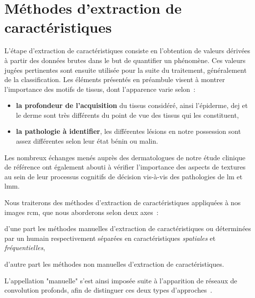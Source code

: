 \newpage

\section{Méthodes d'extraction de caractéristiques}
\label{chap:feature_extraction}
L'étape d'extraction de caractéristiques consiste en l'obtention de valeurs dérivées à partir des données brutes dans le but de quantifier un phénomène. Ces valeurs jugées pertinentes sont ensuite utilisée pour la suite du traitement, généralement de la classification. Les éléments présentés en préambule visent à montrer l'importance des motifs de tissus, dont l'apparence varie selon~:
\begin{itemize}
    \item \textbf{la profondeur de l'acquisition} du tissus considéré, ainsi l'épiderme, \gls{dej} et le derme sont très différents du point de vue des tissus qui les constituent,
    \item \textbf{la pathologie à identifier}, les différentes lésions en notre possession sont assez différentes selon leur état bénin ou malin.
\end{itemize}
Les nombreux échanges menés auprès des dermatologues de notre étude clinique de référence ont également abouti à vérifier l'importance des aspects de textures au sein de leur processus cognitifs de décision vis-à-vis des pathologies de \gls{lm} et \gls{lmm}.\par

Nous traiterons des méthodes d'extraction de caractéristiques appliquées à nos images \gls{rcm}, que nous aborderons selon deux axes~:
\begin{inlinerate}
    \item d'une part les méthodes manuelles d'extraction de caractéristiques ou déterminées par un humain respectivement séparées en caractéristiques \textit{spatiales} et \textit{fréquentielles},
    \item d'autre part les méthodes non manuelles d'extraction de caractéristiques.
\end{inlinerate} 
L'appellation "manuelle" s'est ainsi imposée suite à l'apparition de réseaux de convolution profonds, afin de distinguer ces deux types d'approches~\cite{Nanni2017}.\par

